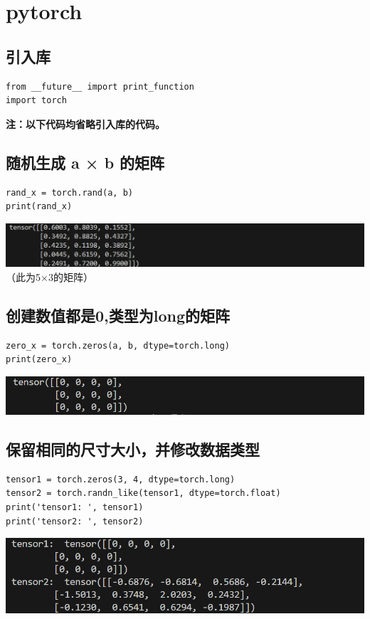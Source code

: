 \documentclass[UTF8,a4paper]{ctexart}
\begin{document}
\section{pytorch}
\subsection{引入库}
\begin{lstlisting}
from __future__ import print_function
import torch
\end{lstlisting}
\textbf{注：以下代码均省略引入库的代码。}
\subsection{随机生成 a × b 的矩阵}
\begin{lstlisting}
rand_x = torch.rand(a, b)
print(rand_x)
\end{lstlisting}
\includegraphics[width=1\textwidth]{./pictures/tensor1.png}
（此为5×3的矩阵）
\subsection{创建数值都是0,类型为long的矩阵}
\begin{lstlisting}
zero_x = torch.zeros(a, b, dtype=torch.long)
print(zero_x)
\end{lstlisting}
\includegraphics[width=1\textwidth]{./pictures/tensor2.png}
\subsection{保留相同的尺寸大小，并修改数据类型}
\begin{lstlisting}
tensor1 = torch.zeros(3, 4, dtype=torch.long)
tensor2 = torch.randn_like(tensor1, dtype=torch.float)
print('tensor1: ', tensor1)
print('tensor2: ', tensor2)
\end{lstlisting}
\includegraphics[width=1\textwidth]{./pictures/tensor3.png}
\end{document}
